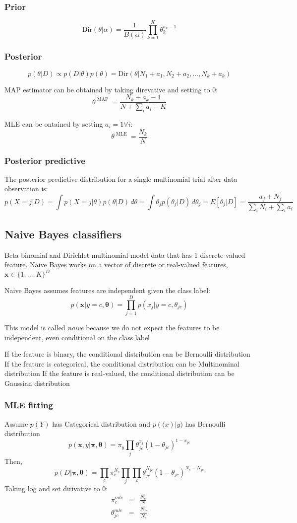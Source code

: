 \documentclass[11pt]{article}
\begin{document}
\subsubsection{Prior}
\[
\mathrm{Dir}(\theta|\alpha) = \frac{1}{B(\alpha)}\prod_{k=1}^K\theta_k^{a_k-1}
\]

\subsubsection{Posterior}
\[
p(\theta|D) \propto p(D|\theta)p(\theta) = \mathrm{Dir}(\theta|N_1+a_1,N_2+a_2,...,N_k+a_k)
\]

MAP estimator can be obtained by taking direvative and setting to 0:
\[
\theta^{\mbox{ MAP }} = \frac{N_k+a_k-1}{N+\sum_i a_i - K}
\]

MLE can be ontained by setting $a_i=1 \forall i$:
\[
\theta^{\mbox{ MLE }} = \frac{N_k}{N}
\]

\subsubsection{Posterior predictive}
The posterior predictive distribution for a single multinomial trial after data observation is:
\[
p(X=j|D)=\int p(X=j|\theta)p(\theta|D)\, d\theta=\int \theta_j p(\theta_j|D)\,d\theta_j=E[\theta_j|D]=\frac{a_j+N_j}{\sum_i N_i + \sum_i a_i}
\]

\subsection{Naive Bayes classifiers}
Beta-binomial and Dirichlet-multinomial model data that has 1 discrete valued feature. Naive Bayes works on a vector of discrete or real-valued features, $\mathbf{x} \in \{1,...,K\}^D$

Naive Bayes assumes features are independent given the class label:
\[
p(\mathbf{x}|y=c,\mathbf{\theta}) = \prod_{j=1}^D p(x_j|y=c,\theta_{jc})
\]

This model is called \emph{naive} because we do not expect the features to be independent, even conditional on the class label

If the feature is binary, the conditional distribution can be Bernoulli distribution
If the feature is categorical, the conditional distribution can be Multinominal distribution
If the feature is real-valued, the conditional distribution can be Gaussian distribution

\subsubsection{MLE fitting}
Assume $p(Y)$ has Categorical distribution and $p(\mathbf(x)|y)$ has Bernoulli distribution
\[
p(\mathbf{x},y|\mathbf{\pi,\theta}) = \pi_y \prod_j \theta_{jc}^{x_{j}} (1-\theta_{jc})^{1-x_{jc}}
\]
Then,
\[
p(D|\mathbf{\pi,\theta}) = \prod_c \pi_c^{N_c} \prod_j \prod_c \theta_{jc}^{N_{jc}}(1-\theta_{jc})^{N_c - N_{jc}}
\]
Taking log and set dirivative to $0$:
\begin{eqnarray*}
\pi_c^{mle} &=& \frac{N_c}{N}\\
\theta_{jc}^{mle} &=& \frac{N_{jc}}{N_c}
\end{eqnarray*}
\end{document}
